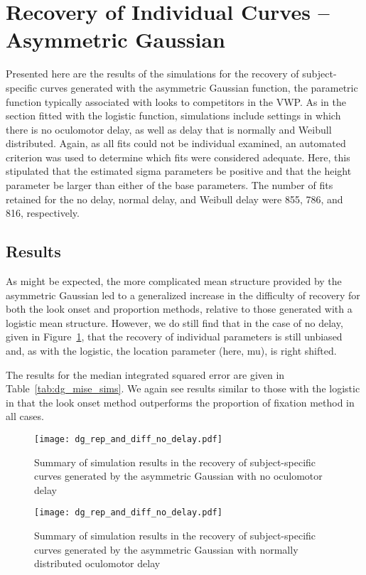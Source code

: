 \section{Recovery of Individual Curves -- Asymmetric Gaussian}

Presented here are the results of the simulations for the recovery of subject-specific curves generated with the asymmetric Gaussian function, the parametric function typically associated with looks to competitors in the VWP. As in the section fitted with the logistic function, simulations include settings in which there is no oculomotor delay, as well as delay that is normally and Weibull distributed. Again, as all fits could not be individual examined, an automated criterion was used to determine which fits were considered  adequate. Here, this stipulated that the estimated sigma parameters be positive and that the height parameter be larger than either of the base parameters. The number of fits retained for the no delay, normal delay, and Weibull delay were  855, 786, and 816, respectively.


\subsection{Results}

As might be expected, the more complicated mean structure provided by the asymmetric Gaussian led to a generalized increase in the difficulty of recovery for both the look onset and proportion methods, relative to those generated with a logistic mean structure. However, we do still find that in the case of no delay, given in Figure~\ref{fig:dg_rep_curves_no_delay}, that the recovery of individual parameters is still unbiased and, as with the logistic, the location parameter (here, mu), is right shifted.

The results for the median integrated squared error are given in Table~\ref{tab:dg_mise_sims}. We again see results similar to those with the logistic in that the look onset method outperforms the proportion of fixation method in all cases. 

\begin{figure}[H]
\centering
\texttt{[image: dg\_rep\_and\_diff\_no\_delay.pdf]}
\caption{Summary of simulation results in the recovery of subject-specific curves generated by the asymmetric Gaussian with no oculomotor delay}
\label{fig:dg_rep_curves_no_delay}
\end{figure}

\begin{figure}[H]
\centering
\texttt{[image: dg\_rep\_and\_diff\_no\_delay.pdf]}
\caption{Summary of simulation results in the recovery of subject-specific curves generated by the asymmetric Gaussian with normally distributed oculomotor delay}
\label{fig:dg_rep_curves_normal_delay}
\end{figure}


